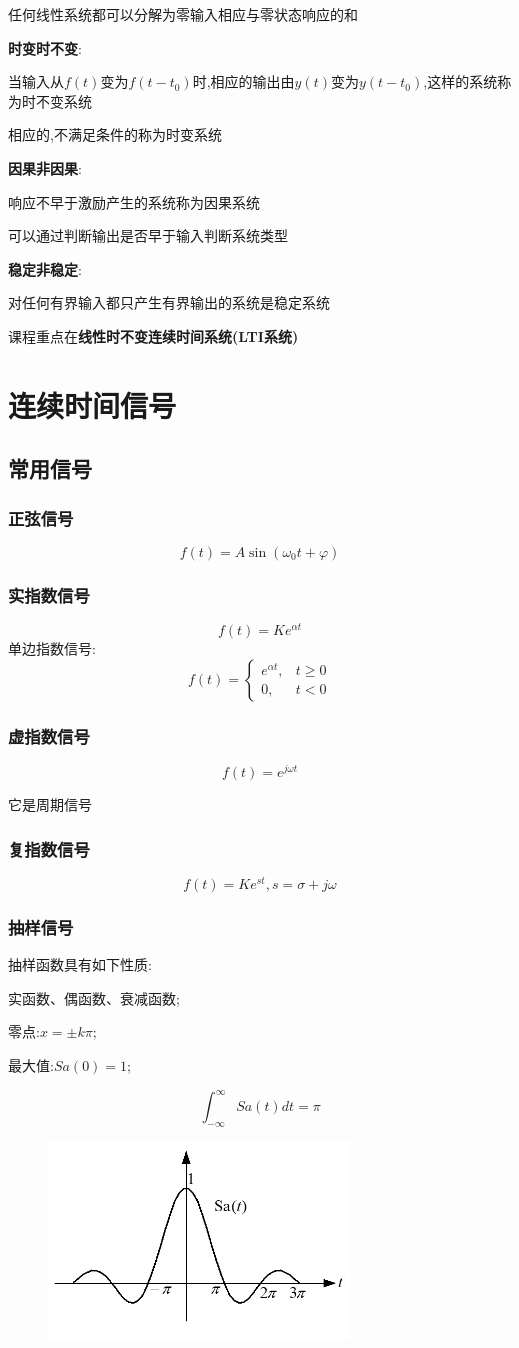 \documentclass[12pt, a4paper, oneside]{ctexart}
\begin{document}
任何线性系统都可以分解为零输入相应与零状态响应的和

\textbf{时变时不变}:

当输入从$f(t)$变为$f(t-t_0)$时,相应的输出由$y(t)$变为$y(t-t_0)$,这样的系统称为时不变系统

相应的,不满足条件的称为时变系统

\textbf{因果非因果}:

响应不早于激励产生的系统称为因果系统

可以通过判断输出是否早于输入判断系统类型

\textbf{稳定非稳定}:

对任何有界输入都只产生有界输出的系统是稳定系统

课程重点在\textbf{线性时不变连续时间系统(LTI系统)}

\section{连续时间信号}
\subsection{常用信号}
\subsubsection{正弦信号}
\[f(t)=A\sin (\omega_0t+\varphi)\]

\subsubsection{实指数信号}
\[f(t)=Ke^{\alpha t}\]
单边指数信号:
\[
    f(t)=\begin{cases}
        e^{\alpha t},&t \ge 0\\
        0,&t < 0
    \end{cases}
\]

\subsubsection{虚指数信号}
\[f(t)=e^{j\omega t}\]

它是周期信号

\subsubsection{复指数信号}
\[f(t)=Ke^{st},s=\sigma +j\omega \]

\subsubsection{抽样信号}
抽样函数具有如下性质:

实函数、偶函数、衰减函数;

零点:$x=\pm k\pi$;

最大值:$Sa(0)=1$;

\[
    \int_{-\infty}^{\infty}Sa(t)dt=\pi
\]
\begin{figure}[htbp]
    \centering
    \includegraphics[width=8cm]{抽样函数.jpg}
\end{figure}
\end{document}
